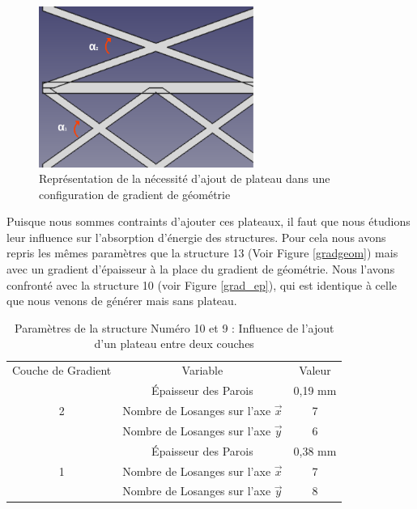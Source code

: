 \documentclass[a4paper]{article}
\begin{document}
	\begin{figure}[H]
		\centering
		\includegraphics[width=7cm]{Images/6/gradient_geom_alpha.pdf}
		\caption{Représentation de la nécessité d’ajout de plateau dans une configuration de gradient de géométrie}
	\end{figure}

	Puisque nous sommes contraints d'ajouter ces plateaux, il faut que nous étudions leur influence sur l'absorption d'énergie des structures. Pour cela nous avons repris les mêmes paramètres que la structure 13 (Voir Figure \ref{gradgeom}) mais avec un gradient d'épaisseur à la place du gradient de géométrie. Nous l'avons confronté avec la structure 10 (voir Figure \ref{grad_ep}), qui est identique à celle que nous venons de générer mais sans plateau.
	
	\begin{table}[H]
		\centering
		\begin{tabular}{|c|c|c|}
			\hline
			\rowcolor{Gray}
			\multicolumn{3}{c}{Structure avec gradient d'épaisseur avec plateau (9) et sans plateau (10)}\\\hline
			\rowcolor{Gray}
			Couche de Gradient & Variable & Valeur\\
			\hline\hline
			& \textcolor[rgb]{1,0,0}{Épaisseur des Parois} & \textcolor[rgb]{1,0,0}{0,19 mm}\\
			\textcolor[rgb]{1,0,0}{2} & \textcolor[rgb]{1,0,0}{Nombre de Losanges sur l'axe $\vec{x}$} & \textcolor[rgb]{1,0,0}{7}\\
			& \textcolor[rgb]{1,0,0}{Nombre de Losanges sur l'axe $\vec{y}$} & \textcolor[rgb]{1,0,0}{6}\\
			\hline
			& \textcolor[rgb]{0,0.5,0}{Épaisseur des Parois} & \textcolor[rgb]{0,0.5,0}{0,38 mm}\\
			\textcolor[rgb]{0,0.5,0}{1} & \textcolor[rgb]{0,0.5,0}{Nombre de Losanges sur l'axe $\vec{x}$} & \textcolor[rgb]{0,0.5,0}{7}\\
			& \textcolor[rgb]{0,0.5,0}{Nombre de Losanges sur l'axe $\vec{y}$} & \textcolor[rgb]{0,0.5,0}{8}\\
			\hline
		\end{tabular}
		\caption{Paramètres de la structure Numéro 10 et 9 : Influence de l'ajout d'un plateau entre deux couches}
	\end{table}
\end{document}
